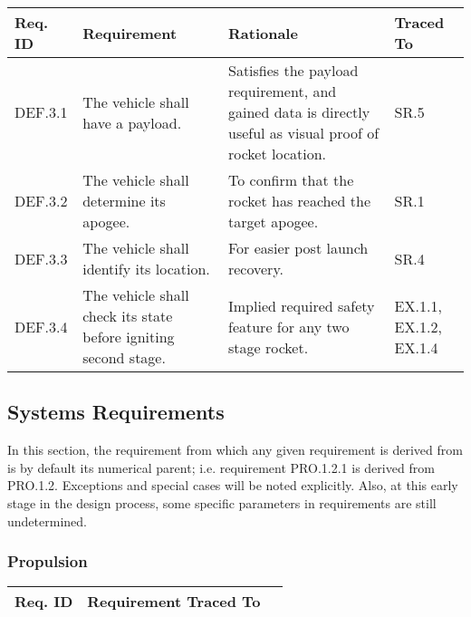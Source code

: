 \begin{table}[htbp]
    \footnotesize 
    \setlength{\tymin}{40pt}
    \let\raggedright\RaggedRight
    
    \begin{tabulary}{\textwidth}{@{}LLLL@{}}
    \toprule
        \textbf{Req. ID} & \textbf{Requirement} & \textbf{Rationale} & \textbf{Traced To} \\
    \midrule
        DEF.3.1 & The vehicle shall have a payload. & Satisfies the payload requirement, and gained data is directly useful as visual proof of rocket location. & SR.5 \\
        DEF.3.2 & The vehicle shall determine its apogee. & To confirm that the rocket has reached the target apogee. & SR.1 \\ 
        DEF.3.3 & The vehicle shall identify its location. & For easier post launch recovery.
        & SR.4 \\
        DEF.3.4 & The vehicle shall check its state before igniting second stage. & Implied required safety feature for any two stage rocket. & EX.1.1, EX.1.2, EX.1.4 \\
    \bottomrule
    \end{tabulary}

    \label{table:func-3}
\end{table}


\subsection{Systems Requirements}
In this section, the requirement from which any given requirement is derived from is by default its numerical parent; i.e. requirement PRO.1.2.1 is derived from PRO.1.2. Exceptions and special cases will be noted explicitly. Also, at this early stage in the design process, some specific parameters in requirements are still undetermined. 

\subsubsection{Propulsion}
\begin{table}[htbp]
    \footnotesize 
    \setlength{\tymin}{40pt}
    \let\raggedright\RaggedRight
    
    \begin{tabulary}{\textwidth}{@{}LLL@{}}
    \toprule
        \textbf{Req. ID} & \textbf{Requirement} \textbf{Traced To} \\
    \midrule
        
    \bottomrule
    \end{tabulary}

    \label{table:func-3}
\end{table}